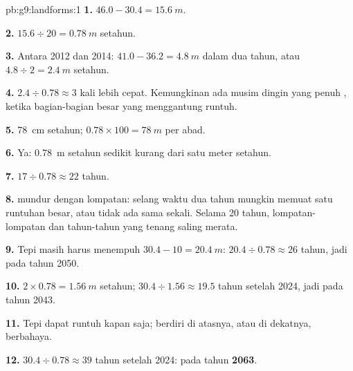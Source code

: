 \begin{solution}{pb:g9:landforms:1}
\textbf{1.} $46.0 - 30.4 = \qty{15.6}{m}$.

\textbf{2.} $15.6 \div 20 = \qty{0.78}{m}$ setahun.

\textbf{3.} Antara 2012 dan 2014: $41.0 - 36.2 = \qty{4.8}{m}$ dalam dua
tahun, atau $4.8 \div 2 = \qty{2.4}{m}$ setahun.

\textbf{4.} $2.4 \div 0.78 \approx 3$ kali lebih cepat. Kemungkinan ada
musim dingin yang penuh , ketika bagian-bagian besar yang menggantung
runtuh.

\textbf{5.} \qty{78}{cm} setahun; $0.78 \times 100 = \qty{78}{m}$ per
abad.

\textbf{6.} Ya: \qty{0.78}{m} setahun sedikit kurang dari satu meter setahun.

\textbf{7.} $17 \div 0.78 \approx 22$ tahun.

\textbf{8.}  mundur dengan lompatan: selang waktu dua tahun mungkin
memuat satu runtuhan besar, atau tidak ada sama sekali. Selama 20 tahun,
lompatan-lompatan dan tahun-tahun yang tenang saling merata.

\textbf{9.} Tepi  masih harus menempuh $30.4 - 10 = \qty{20.4}{m}$:
$20.4 \div 0.78
\approx 26$ tahun, jadi pada tahun 2050.

\textbf{10.} $2 \times 0.78 = \qty{1.56}{m}$ setahun; $30.4 \div 1.56
\approx 19.5$ tahun setelah 2024, jadi pada tahun 2043.

\textbf{11.} Tepi  dapat runtuh kapan saja; berdiri di atasnya, atau
di dekatnya, berbahaya.

\textbf{12.} $30.4 \div 0.78 \approx 39$ tahun setelah 2024: pada tahun
\textbf{2063}.
\end{solution}
